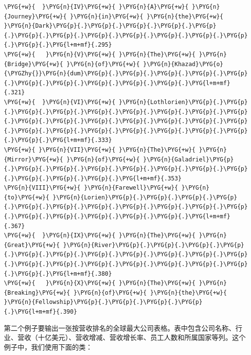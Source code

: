 \begin{codeblockbg}
\begin{Verbatim}[commandchars=\\\{\},breaklines=true,breakanywhere=true,fontsize=\codefont,xleftmargin=17bp]
\PYG{+w}{  }\PYG{n}{IV}\PYG{+w}{ }\PYG{n}{A}\PYG{+w}{ }\PYG{n}{Journey}\PYG{+w}{ }\PYG{n}{in}\PYG{+w}{ }\PYG{n}{the}\PYG{+w}{ }\PYG{n}{Dark}\PYG{p}{.}\PYG{p}{.}\PYG{p}{.}\PYG{p}{.}\PYG{p}{.}\PYG{p}{.}\PYG{p}{.}\PYG{p}{.}\PYG{p}{.}\PYG{p}{.}\PYG{p}{.}\PYG{p}{.}\PYG{p}{.}\PYG{l+m+mf}{.295}
\PYG{+w}{   }\PYG{n}{V}\PYG{+w}{ }\PYG{n}{The}\PYG{+w}{ }\PYG{n}{Bridge}\PYG{+w}{ }\PYG{n}{of}\PYG{+w}{ }\PYG{n}{Khazad}\PYG{o}{\PYGZhy{}}\PYG{n}{dum}\PYG{p}{.}\PYG{p}{.}\PYG{p}{.}\PYG{p}{.}\PYG{p}{.}\PYG{p}{.}\PYG{p}{.}\PYG{p}{.}\PYG{p}{.}\PYG{p}{.}\PYG{l+m+mf}{.321}
\PYG{+w}{  }\PYG{n}{VI}\PYG{+w}{ }\PYG{n}{Lothlorien}\PYG{p}{.}\PYG{p}{.}\PYG{p}{.}\PYG{p}{.}\PYG{p}{.}\PYG{p}{.}\PYG{p}{.}\PYG{p}{.}\PYG{p}{.}\PYG{p}{.}\PYG{p}{.}\PYG{p}{.}\PYG{p}{.}\PYG{p}{.}\PYG{p}{.}\PYG{p}{.}\PYG{p}{.}\PYG{p}{.}\PYG{p}{.}\PYG{p}{.}\PYG{p}{.}\PYG{p}{.}\PYG{p}{.}\PYG{p}{.}\PYG{l+m+mf}{.333}
\PYG{+w}{ }\PYG{n}{VII}\PYG{+w}{ }\PYG{n}{The}\PYG{+w}{ }\PYG{n}{Mirror}\PYG{+w}{ }\PYG{n}{of}\PYG{+w}{ }\PYG{n}{Galadriel}\PYG{p}{.}\PYG{p}{.}\PYG{p}{.}\PYG{p}{.}\PYG{p}{.}\PYG{p}{.}\PYG{p}{.}\PYG{p}{.}\PYG{p}{.}\PYG{p}{.}\PYG{p}{.}\PYG{l+m+mf}{.353}
\PYG{n}{VIII}\PYG{+w}{ }\PYG{n}{Farewell}\PYG{+w}{ }\PYG{n}{to}\PYG{+w}{ }\PYG{n}{Lorien}\PYG{p}{.}\PYG{p}{.}\PYG{p}{.}\PYG{p}{.}\PYG{p}{.}\PYG{p}{.}\PYG{p}{.}\PYG{p}{.}\PYG{p}{.}\PYG{p}{.}\PYG{p}{.}\PYG{p}{.}\PYG{p}{.}\PYG{p}{.}\PYG{p}{.}\PYG{p}{.}\PYG{l+m+mf}{.367}
\PYG{+w}{  }\PYG{n}{IX}\PYG{+w}{ }\PYG{n}{The}\PYG{+w}{ }\PYG{n}{Great}\PYG{+w}{ }\PYG{n}{River}\PYG{p}{.}\PYG{p}{.}\PYG{p}{.}\PYG{p}{.}\PYG{p}{.}\PYG{p}{.}\PYG{p}{.}\PYG{p}{.}\PYG{p}{.}\PYG{p}{.}\PYG{p}{.}\PYG{p}{.}\PYG{p}{.}\PYG{p}{.}\PYG{p}{.}\PYG{p}{.}\PYG{p}{.}\PYG{p}{.}\PYG{p}{.}\PYG{l+m+mf}{.380}
\PYG{+w}{   }\PYG{n}{X}\PYG{+w}{ }\PYG{n}{The}\PYG{+w}{ }\PYG{n}{Breaking}\PYG{+w}{ }\PYG{n}{of}\PYG{+w}{ }\PYG{n}{the}\PYG{+w}{ }\PYG{n}{Fellowship}\PYG{p}{.}\PYG{p}{.}\PYG{p}{.}\PYG{p}{.}\PYG{l+m+mf}{.390}
\end{Verbatim}
\end{codeblockbg}



第二个例子要输出一张按营收排名的全球最大公司表格。表中包含公司名称、行业、营收（十亿美元）、营收增减、营收增长率、员工人数和所属国家等列。这个例子中，我们使用下面的类：



